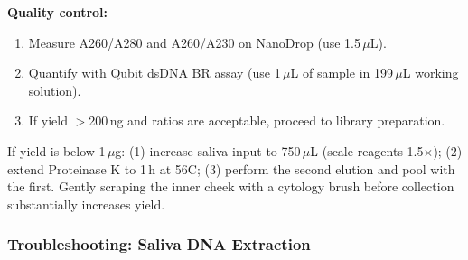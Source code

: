 \begin{protocolbox}[title={Protocol: DNA Extraction from Human Saliva}]
\textbf{Quality control:}
\begin{enumerate}[nosep]
  \item Measure A260/A280 and A260/A230 on NanoDrop (use 1.5\,$\mu$L).
  \item Quantify with Qubit dsDNA BR assay (use 1\,$\mu$L of sample in 199\,$\mu$L working solution).
  \item If yield $>$200\,ng and ratios are acceptable, proceed to library preparation.
\end{enumerate}
\end{protocolbox}
\begin{tipbox}[title={Increasing Saliva DNA Yield}]
If yield is below 1\,$\mu$g: (1) increase saliva input to 750\,$\mu$L (scale reagents 1.5$\times$); (2) extend Proteinase K to 1\,h at 56\textdegree C; (3) perform the second elution and pool with the first. Gently scraping the inner cheek with a cytology brush before collection substantially increases yield.
\end{tipbox}

\subsubsection{Troubleshooting: Saliva DNA Extraction}

